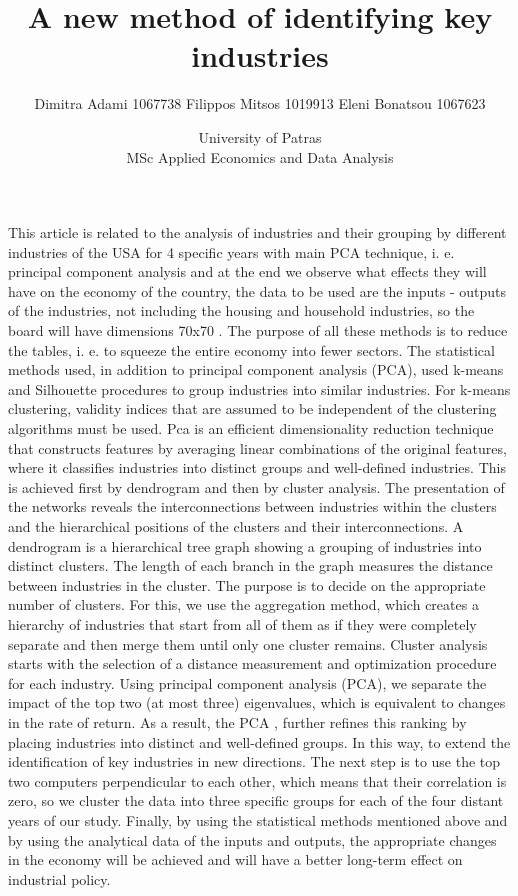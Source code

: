 \documentclass{article}
\title{A new method of identifying key industries}
\author{Dimitra Adami 1067738
	Filippos Mitsos 1019913
	Eleni Bonatsou 1067623}
\date{University of Patras\\
	MSc Applied Economics and Data Analysis}
\begin{document}
	
	\maketitle
	
	
	This article is related to the analysis of industries and their grouping by different industries of the USA for 4 specific years with main PCA technique, i. e. principal component analysis and at the end we observe what effects they will have on the economy of the country, the data to be used are the inputs - outputs of the industries, not including the housing and household industries, so the board will have dimensions 70x70 . The purpose of all these methods is to reduce the tables, i. e. to squeeze the entire economy into fewer sectors. The statistical methods used, in addition to principal component analysis (PCA), used k-means and Silhouette procedures to group industries into similar industries. For k-means clustering, validity indices that are assumed to be independent of the clustering algorithms must be used. Pca is an efficient dimensionality reduction technique that constructs features by averaging linear combinations of the original features, where it classifies industries into distinct groups and well-defined industries. This is achieved first by dendrogram and then by cluster analysis. The presentation of the networks reveals the interconnections between industries within the clusters and the hierarchical positions of the clusters and their interconnections. A dendrogram is a hierarchical tree graph showing a grouping of industries into distinct clusters. The length of each branch in the graph measures the distance between industries in the cluster. The purpose is to decide on the appropriate number of clusters. For this, we use the aggregation method, which creates a hierarchy of industries that start from all of them as if they were completely separate and then merge them until only one cluster remains. Cluster analysis starts with the selection of a distance measurement and optimization procedure for each industry. Using principal component analysis (PCA), we separate the impact of the top two (at most three) eigenvalues, which is equivalent to changes in the rate of return. As a result, the PCA , further refines this ranking by placing industries into distinct and well-defined groups. In this way, to extend the identification of key industries in new directions. The next step is to use the top two computers perpendicular to each other, which means that their correlation is zero, so we cluster the data into three specific groups for each of the four distant years of our study. Finally, by using the statistical methods mentioned above and by using the analytical data of the inputs and outputs, the appropriate changes in the economy will be achieved and will have a better long-term effect on industrial policy.
\end{document}
